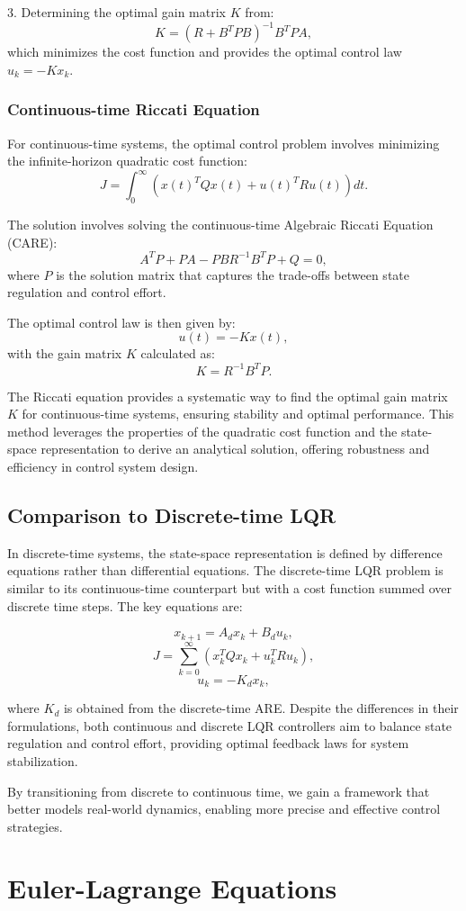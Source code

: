 \documentclass[a4 paper]{article}
\begin{document}
3. Determining the optimal gain matrix \( K \) from:
   \[
   K = (R + B^T P B)^{-1} B^T P A,
   \]
   which minimizes the cost function and provides the optimal control law \( u_k = -K x_k \).

\subsubsection{Continuous-time Riccati Equation}
For continuous-time systems, the optimal control problem involves minimizing the infinite-horizon quadratic cost function:
   \[
   J = \int_{0}^{\infty} \left( x(t)^T Q x(t) + u(t)^T R u(t) \right) dt.
   \]

The solution involves solving the continuous-time Algebraic Riccati Equation (CARE):
   \[
   A^T P + P A - P B R^{-1} B^T P + Q = 0,
   \]
   where \( P \) is the solution matrix that captures the trade-offs between state regulation and control effort.

The optimal control law is then given by:
   \[
   u(t) = -K x(t),
   \]
   with the gain matrix \( K \) calculated as:
   \[
   K = R^{-1} B^T P.
   \]

The Riccati equation provides a systematic way to find the optimal gain matrix \( K \) for continuous-time systems, ensuring stability and optimal performance. This method leverages the properties of the quadratic cost function and the state-space representation to derive an analytical solution, offering robustness and efficiency in control system design.

\subsection{Comparison to Discrete-time LQR}
In discrete-time systems, the state-space representation is defined by difference equations rather than differential equations. The discrete-time LQR problem is similar to its continuous-time counterpart but with a cost function summed over discrete time steps. The key equations are:

\begin{equation}
x_{k+1} = A_d x_k + B_d u_k,
\end{equation}
\begin{equation}
J = \sum_{k=0}^{\infty} \left( x_k^T Q x_k + u_k^T R u_k \right),
\end{equation}
\begin{equation}
u_k = -K_d x_k,
\end{equation}

where \( K_d \) is obtained from the discrete-time ARE. Despite the differences in their formulations, both continuous and discrete LQR controllers aim to balance state regulation and control effort, providing optimal feedback laws for system stabilization.

By transitioning from discrete to continuous time, we gain a framework that better models real-world dynamics, enabling more precise and effective control strategies.



\newpage
\section{Euler-Lagrange Equations}
\end{document}
